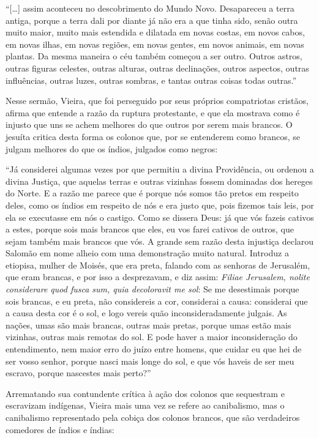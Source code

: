 ``{[}\ldots{}{]} assim aconteceu no descobrimento do Mundo Novo. Desapareceu
a terra antiga, porque a terra dali por diante já não era a que tinha
sido, senão outra muito maior, muito mais estendida e dilatada em novas
costas, em novos cabos, em novas ilhas, em novas regiões, em novas
gentes, em novos animais, em novas plantas. Da mesma maneira o céu
também começou a ser outro. Outros astros, outras figuras celestes,
outras alturas, outras declinações, outros aspectos, outras influências,
outras luzes, outras sombras, e tantas outras coisas todas outras.''

Nesse sermão, Vieira, que foi perseguido por seus próprios compatriotas
cristãos, afirma que entende a razão da ruptura protestante, e que ela
mostrava como é injusto que uns se achem melhores do que outros por
serem mais brancos. O jesuíta critica desta forma os colonos que, por se
entenderem como brancos, se julgam melhores do que os índios, julgados
como negros:

``Já considerei algumas vezes por que permitiu a divina Providência, ou
ordenou a divina Justiça, que aquelas terras e outras vizinhas fossem
dominadas dos hereges do Norte. E a razão me parece que é porque nós
somos tão pretos em respeito deles, como os índios em respeito de nós e
era justo que, pois fizemos tais leis, por ela se executasse em nós o
castigo. Como se dissera Deus: já que vós fazeis cativos a estes, porque
sois mais brancos que eles, eu vos farei cativos de outros, que sejam
também mais brancos que vós. A grande sem razão desta injustiça declarou
Salomão em nome alheio com uma demonstração muito natural. Introduz a
etiopisa, mulher de Moisés, que era preta, falando com as senhoras de
Jerusalém, que eram brancas, e por isso a desprezavam, e diz assim:
\emph{Filiae Jerusalem, nolite considerare quod fusca sum, quia
decoloravit me sol}: Se me desestimais porque sois brancas, e eu preta,
não considereis a cor, considerai a causa: considerai que a causa desta
cor é o sol, e logo vereis quão inconsideradamente julgais. As nações,
umas são mais brancas, outras mais pretas, porque umas estão mais
vizinhas, outras mais remotas do sol. E pode haver a maior
inconsideração do entendimento, nem maior erro do juízo entre homens,
que cuidar eu que hei de ser vosso senhor, porque nasci mais longe do
sol, e que vós haveis de ser meu escravo, porque nascestes mais perto?''

Arrematando sua contundente crítica à ação dos colonos que sequestram e
escravizam indígenas, Vieira mais uma vez se refere ao canibalismo, mas
o canibalismo representado pela cobiça dos colonos brancos, que são
verdadeiros comedores de índios e índias:

